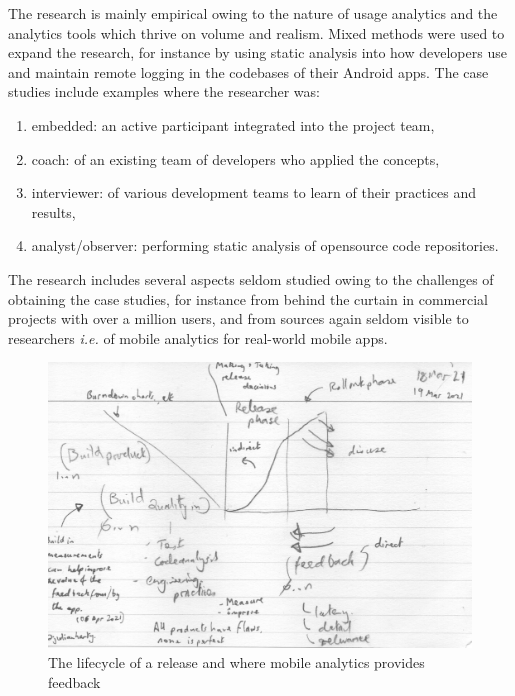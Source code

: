 The research is mainly empirical owing to the nature of usage analytics and the analytics tools which thrive on volume and realism. Mixed methods were used to expand the research, for instance by using static analysis into how developers use and maintain remote logging in the codebases of their Android apps. The case studies include examples where the researcher was:
\begin{enumerate}
    \item embedded: an active participant integrated into the project team,
    \item coach: of an existing team of developers who applied the concepts,
    \item interviewer: of various development teams to learn of their practices and results,
    \item analyst/observer: performing static analysis of opensource code repositories.
\end{enumerate}

The research includes several aspects seldom studied owing to the challenges of obtaining the case studies, for instance from behind the curtain in commercial projects with over a million users, and from sources again seldom visible to researchers \emph{i.e.} of mobile analytics for real-world mobile apps.

\newpage

\begin{figure}
    \centering
    \includegraphics[width=15cm]{images/rough-sketches/Red-Thread-Rough-Sketch.jpeg}
    \caption{The lifecycle of a release and where mobile analytics provides feedback}
    \label{fig:red-thread-for-this-thesis}
\end{figure}

